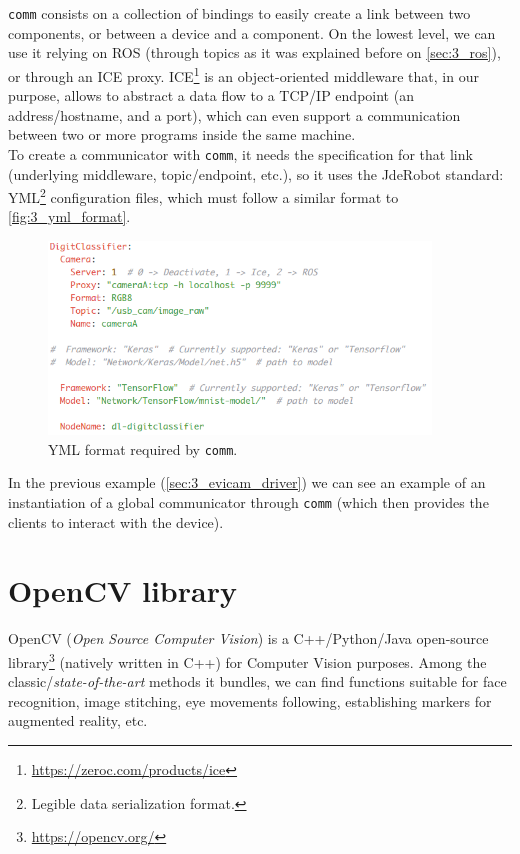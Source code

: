 		\texttt{comm} consists on a collection of bindings to easily create a link between two components, or between a device and a component. On the lowest level, we can use it relying on ROS (through topics as it was explained before on \autoref{sec:3_ros}), or through an ICE proxy. ICE\footnote{\url{https://zeroc.com/products/ice}} is an object-oriented middleware that, in our purpose, allows to abstract a data flow to a TCP/IP endpoint (an address/hostname, and a port), which can even support a communication between two or more programs inside the same machine.\\
		
		To create a communicator with \texttt{comm}, it needs the specification for that link (underlying middleware, topic/endpoint, etc.), so it uses the JdeRobot standard: YML\footnote{Legible data serialization format.} configuration files, which must follow a similar format to  \autoref{fig:3_yml_format}.
		\begin{figure}[h]
			\centering
			\includegraphics[width=4in]{images/yml_format}
			\caption{YML format required by \texttt{comm}.}
			\label{fig:3_yml_format}
		\end{figure}
		
		In the previous example (\ref{sec:3_evicam_driver}) we can see an example of an instantiation of a global communicator through \texttt{comm} (which then provides the clients to interact with the device).
		
\section{OpenCV library}
	OpenCV (\emph{Open Source Computer Vision}) is a C++/Python/Java open-source library\footnote{\url{https://opencv.org/}} (natively written in C++) for Computer Vision purposes. Among the classic/\emph{state-of-the-art} methods it bundles, we can find functions suitable for face recognition, image stitching, eye movements following, establishing markers for augmented reality, etc.\\
	
